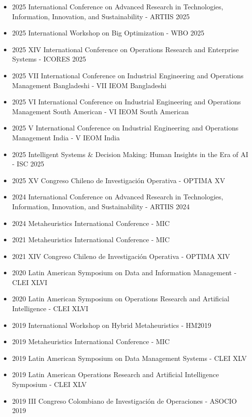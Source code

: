 {\begin{itemize}
    \item 2025 International Conference on Advanced Research in Technologies, Information, Innovation, and Sustainability - ARTIIS 2025
    \item 2025 International Workshop on Big Optimization - WBO 2025
    \item 2025 XIV International Conference on Operations Research and Enterprise Systems - ICORES 2025
    \item 2025 VII International Conference on Industrial Engineering and Operations Management Bangladeshi - VII IEOM Bangladeshi
    \item 2025 VI International Conference on Industrial Engineering and Operations Management South American - VI IEOM South American
    \item 2025 V International Conference on Industrial Engineering and Operations Management India - V IEOM India
    \item 2025 Intelligent Systems \& Decision Making: Human Insights in the Era of AI - ISC 2025
    \item 2025 XV Congreso Chileno de Investigaci\'on Operativa - OPTIMA XV
    \item 2024 International Conference on Advanced Research in Technologies, Information, Innovation, and Sustainability - ARTIIS 2024
    \item 2024 Metaheuristics International Conference - MIC
    \item 2021 Metaheuristics International Conference - MIC
    \item 2021 XIV Congreso Chileno de Investigaci\'on Operativa - OPTIMA XIV
    \item 2020 Latin American Symposium on Data and Information Management - CLEI XLVI
    \item 2020 Latin American Symposium on Operations Research and Artificial Intelligence - CLEI XLVI
    \item 2019 International Workshop on Hybrid Metaheuristics - HM2019
    \item 2019 Metaheuristics International Conference - MIC
    \item 2019 Latin American Symposium on Data Management Systems - CLEI XLV
    \item 2019 Latin American Operations Research and Artificial Intelligence Symposium - CLEI XLV
    \item 2019 III Congreso Colombiano de Investigaci\'on de Operaciones - ASOCIO 2019

\end{itemize}}
